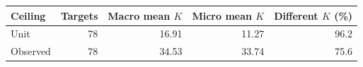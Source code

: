 \begin{tabular}{lrrrr}
\toprule
Ceiling & Targets & Macro mean $K$ & Micro mean $K$ & Different $K$ (\%) \\
\midrule
Unit & 78 & 16.91 & 11.27 & 96.2 \\
Observed & 78 & 34.53 & 33.74 & 75.6 \\
\bottomrule
\end{tabular}
